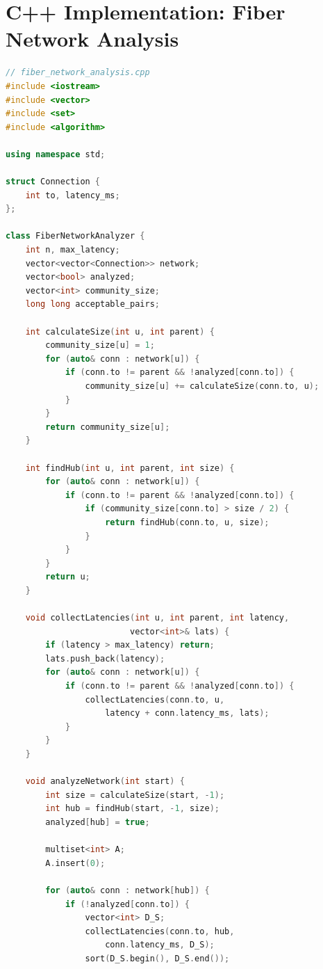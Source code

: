 \documentclass[sigconf]{acmart}
\begin{document}
\section{C++ Implementation: Fiber Network Analysis}
\label{app:fiber-code}

\begin{lstlisting}[language=C++]
// fiber_network_analysis.cpp
#include <iostream>
#include <vector>
#include <set>
#include <algorithm>

using namespace std;

struct Connection { 
    int to, latency_ms; 
};

class FiberNetworkAnalyzer {
    int n, max_latency;
    vector<vector<Connection>> network;
    vector<bool> analyzed;
    vector<int> community_size;
    long long acceptable_pairs;
    
    int calculateSize(int u, int parent) {
        community_size[u] = 1;
        for (auto& conn : network[u]) {
            if (conn.to != parent && !analyzed[conn.to]) {
                community_size[u] += calculateSize(conn.to, u);
            }
        }
        return community_size[u];
    }
    
    int findHub(int u, int parent, int size) {
        for (auto& conn : network[u]) {
            if (conn.to != parent && !analyzed[conn.to]) {
                if (community_size[conn.to] > size / 2) {
                    return findHub(conn.to, u, size);
                }
            }
        }
        return u;
    }
    
    void collectLatencies(int u, int parent, int latency, 
                         vector<int>& lats) {
        if (latency > max_latency) return;
        lats.push_back(latency);
        for (auto& conn : network[u]) {
            if (conn.to != parent && !analyzed[conn.to]) {
                collectLatencies(conn.to, u, 
                    latency + conn.latency_ms, lats);
            }
        }
    }
    
    void analyzeNetwork(int start) {
        int size = calculateSize(start, -1);
        int hub = findHub(start, -1, size);
        analyzed[hub] = true;
        
        multiset<int> A;
        A.insert(0);
        
        for (auto& conn : network[hub]) {
            if (!analyzed[conn.to]) {
                vector<int> D_S;
                collectLatencies(conn.to, hub, 
                    conn.latency_ms, D_S);
                sort(D_S.begin(), D_S.end());
                

\end{lstlisting}
\end{document}
